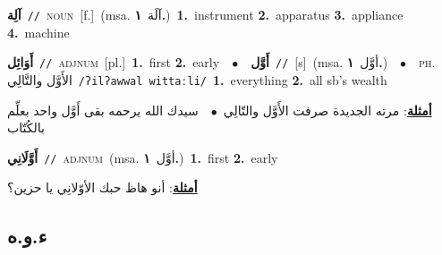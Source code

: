 \documentclass[10pt,a4paper,twoside]{article} %
\begin{document}
\begin{multicols}{2}
{\setlength\topsep{0pt}\textbf{\foreignlanguage{arabic}{آلِة}}\ {\color{gray}\texttt{//}\color{black}}\ \textsc{noun}\ [f.]\ \color{gray}(msa. \foreignlanguage{arabic}{آلَة}~\foreignlanguage{arabic}{\textbf{١.}})\color{black}\ \textbf{1.}~instrument  \textbf{2.}~apparatus  \textbf{3.}~appliance  \textbf{4.}~machine\ } \vspace{2mm}

{\setlength\topsep{0pt}\textbf{\foreignlanguage{arabic}{أَوَائِل}}\ {\color{gray}\texttt{//}\color{black}}\ \textsc{adj\textunderscore num}\ [pl.]\ \textbf{1.}~first  \textbf{2.}~early\ \ $\bullet$\ \ \setlength\topsep{0pt}\textbf{\foreignlanguage{arabic}{أَوَّل}}\ {\color{gray}\texttt{//}\color{black}}\ [s]\ \color{gray}(msa. \foreignlanguage{arabic}{أوَّل}~\foreignlanguage{arabic}{\textbf{١.}})\color{black}\ \ $\bullet$\ \ \textsc{ph.} \color{gray} \foreignlanguage{arabic}{الأَوَّل والتَّالِي}\color{black}\ {\color{gray}\texttt{/{\sffamily ʔilʔawwal wittaːli}/}\color{black}}\ \textbf{1.}~everything  \textbf{2.}~all sb's wealth\  \begin{flushright}\color{gray}\foreignlanguage{arabic}{\textbf{\underline{\foreignlanguage{arabic}{أمثلة}}}: مرته الجديدة صرفت الأَوَّل والتّالِي\ $\bullet$\ \  سيدك الله يرحمه بقى أَوَّل واحد بعلِّم بالكُتّاب}\end{flushright}\color{black}} \vspace{2mm}

{\setlength\topsep{0pt}\textbf{\foreignlanguage{arabic}{أَوَّلَانِي}}\ {\color{gray}\texttt{//}\color{black}}\ \textsc{adj\textunderscore num}\ \color{gray}(msa. \foreignlanguage{arabic}{أوَّل}~\foreignlanguage{arabic}{\textbf{١.}})\color{black}\ \textbf{1.}~first  \textbf{2.}~early\  \begin{flushright}\color{gray}\foreignlanguage{arabic}{\textbf{\underline{\foreignlanguage{arabic}{أمثلة}}}: أنو هاظ حبك الأوّلانِي يا حزين؟}\end{flushright}\color{black}} \vspace{2mm}

\vspace{-3mm}
\subsection*{\color{blue}\foreignlanguage{arabic}{ء.و.ه}\color{blue}{}} 


\end{multicols}
\end{document}
